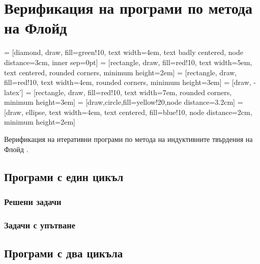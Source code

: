 \chapter{Верификация на програми по метода на Флойд}

 = [diamond, draw, fill=green!10, text width=4em, text badly centered, node distance=3cm, inner sep=0pt]
 = [rectangle, draw, fill=red!10, text width=5em, text centered, rounded corners, minimum height=2em]
 = [rectangle, draw, fill=red!10, text width=4em, rounded corners, minimum height=3em]
 = [draw, -latex']
 = [rectangle, draw, fill=red!10, text width=7em, rounded corners, minimum height=3em]
 = [draw,circle,fill=yellow!20,node distance=3.2cm]
 = [draw, ellipse, text width=4em, text centered, fill=blue!10, node distance=2cm, minimum height=2em]


Верификация на итеративни програми по метода на индуктивните твърдения на Флойд \cite{floyd-verification}.



\section{Програми с един цикъл}

\subsection{Решени задачи}





\subsection{Задачи с упътване}



\section{Програми с два цикъла}

